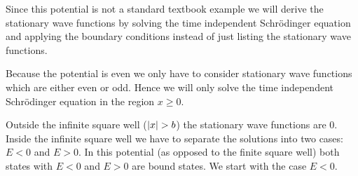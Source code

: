 \documentclass[12pt,a4paper]{article}
\DeclarePairedDelimiter{\abs}{\lvert}{\rvert}
\begin{document}
Since this potential is not a standard textbook example we will derive the stationary wave functions by solving the time independent Schrödinger equation and applying the boundary conditions instead of just listing the stationary wave functions.

Because the potential is even we only have to consider stationary wave functions which are either even or odd. Hence we will only solve the time independent Schrödinger equation in the region $x \geq 0$.

Outside the infinite square well ($\abs{x} > b$) the stationary wave functions are $0$. Inside the infinite square well we have to separate the solutions into two cases: $E < 0$ and $E > 0$. In this potential (as opposed to the finite square well) both states with $E < 0$ and $E > 0$ are bound states. We start with the case $E < 0$.
\end{document}
